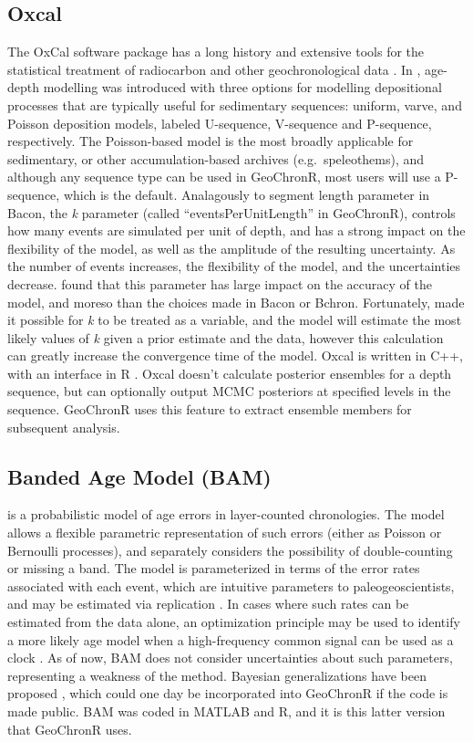 \documentclass[gc, manuscript]{copernicus}
\begin{document}
\subsection{Oxcal}

The OxCal software package has a long history and extensive tools for the statistical treatment of radiocarbon and other geochronological data \citep{BronkRamsey95}.
In \citet{ramsey2008deposition}, age-depth modelling was introduced with three options for modelling depositional processes that are typically useful for sedimentary sequences: uniform, varve, and Poisson deposition models, labeled U-sequence, V-sequence and P-sequence, respectively.
The Poisson-based model is the most broadly applicable for sedimentary, or other accumulation-based archives (e.g.~speleothems), and although any sequence type can be used in GeoChronR, most users will use a P-sequence, which is the default.
Analagously to segment length parameter in Bacon, the \emph{k} parameter (called ``eventsPerUnitLength'' in GeoChronR), controls how many events are simulated per unit of depth, and has a strong impact on the flexibility of the model, as well as the amplitude of the resulting uncertainty.
As the number of events increases, the flexibility of the model, and the uncertainties decrease.
\citet{trachsel2017} found that this parameter has large impact on the accuracy of the model, and moreso than the choices made in Bacon or Bchron.
Fortunately, \citet{bronkramsey2010} made it possible for \emph{k} to be treated as a variable, and the model will estimate the most likely values of \emph{k} given a prior estimate and the data, however this calculation can greatly increase the convergence time of the model.
Oxcal is written in C++, with an interface in R \citep{oxcAAR}.
Oxcal doesn't calculate posterior ensembles for a depth sequence, but can optionally output MCMC posteriors at specified levels in the sequence.
GeoChronR uses this feature to extract ensemble members for subsequent analysis.

\subsection{Banded Age Model (BAM)}

\citet{BAM} is a probabilistic model of age errors in layer-counted chronologies.
The model allows a flexible parametric representation of such errors (either as Poisson or Bernoulli processes), and separately considers the possibility of double-counting or missing a band.
The model is parameterized in terms of the error rates associated with each event, which are intuitive parameters to paleogeoscientists, and may be estimated via replication \citep{DeLong_Paleo3_2013}.
In cases where such rates can be estimated from the data alone, an optimization principle may be used to identify a more likely age model when a high-frequency common signal can be used as a clock \citep{BAM}.
As of now, BAM does not consider uncertainties about such parameters, representing a weakness of the method.
Bayesian generalizations have been proposed \citep{BoersCP2017}, which could one day be incorporated into GeoChronR if the code is made public.
BAM was coded in MATLAB and R, and it is this latter version that GeoChronR uses.
\end{document}
